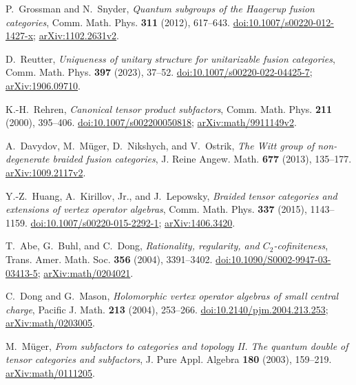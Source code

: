 P.~Grossman and N.~Snyder,
\emph{Quantum subgroups of the Haagerup fusion categories},
Comm. Math. Phys. \textbf{311} (2012), 617--643.
\href{https://doi.org/10.1007/s00220-012-1427-x}{doi:10.1007/s00220-012-1427-x};
\href{https://arxiv.org/abs/1102.2631v2}{arXiv:1102.2631v2}.

D.~Reutter,
\emph{Uniqueness of unitary structure for unitarizable fusion categories},
Comm. Math. Phys. \textbf{397} (2023), 37--52.
\href{https://doi.org/10.1007/s00220-022-04425-7}{doi:10.1007/s00220-022-04425-7};
\href{https://arxiv.org/abs/1906.09710}{arXiv:1906.09710}.

K.-H.~Rehren,
\emph{Canonical tensor product subfactors},
Comm. Math. Phys. \textbf{211} (2000), 395--406.
\href{https://doi.org/10.1007/s002200050818}{doi:10.1007/s002200050818};
\href{https://arxiv.org/abs/math/9911149v2}{arXiv:math/9911149v2}.

A.~Davydov, M.~M\"uger, D.~Nikshych, and V.~Ostrik,
\emph{The Witt group of non-degenerate braided fusion categories},
J. Reine Angew. Math. \textbf{677} (2013), 135--177.
\href{https://arxiv.org/abs/1009.2117v2}{arXiv:1009.2117v2}.

Y.-Z.~Huang, A.~Kirillov, Jr., and J.~Lepowsky,
\emph{Braided tensor categories and extensions of vertex operator algebras},
Comm. Math. Phys. \textbf{337} (2015), 1143--1159.
\href{https://doi.org/10.1007/s00220-015-2292-1}{doi:10.1007/s00220-015-2292-1};
\href{https://arxiv.org/abs/1406.3420}{arXiv:1406.3420}.

T.~Abe, G.~Buhl, and C.~Dong,
\emph{Rationality, regularity, and $C_2$-cofiniteness},
Trans. Amer. Math. Soc. \textbf{356} (2004), 3391--3402.
\href{https://doi.org/10.1090/S0002-9947-03-03413-5}{doi:10.1090/S0002-9947-03-03413-5};
\href{https://arxiv.org/abs/math/0204021}{arXiv:math/0204021}.

C.~Dong and G.~Mason,
\emph{Holomorphic vertex operator algebras of small central charge},
Pacific J. Math. \textbf{213} (2004), 253--266.
\href{https://doi.org/10.2140/pjm.2004.213.253}{doi:10.2140/pjm.2004.213.253};
\href{https://arxiv.org/abs/math/0203005}{arXiv:math/0203005}.

M.~M\"uger,
\emph{From subfactors to categories and topology II.
The quantum double of tensor categories and subfactors},
J. Pure Appl. Algebra \textbf{180} (2003), 159--219.
\href{https://arxiv.org/abs/math/0111205}{arXiv:math/0111205}.


